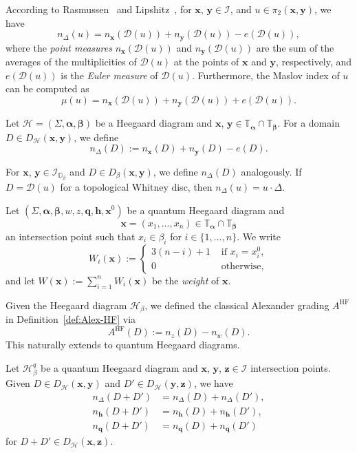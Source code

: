 \documentclass[11pt]{amsart}
\numberwithin{equation}{section}
\numberwithin{figure}{section}
\theoremstyle{definition}
\newcommand{\cD}{\mathcal{D}}
\newcommand{\cH}{\mathcal{H}}
\newcommand{\cI}{\mathcal{I}}
\newcommand{\bD}{\mathbb{D}}
\newcommand{\bT}{\mathbb{T}}
\DeclareMathOperator{\HF}{HF}
\newcommand{\as}{\boldsymbol{\alpha}}
\newcommand{\bs}{\boldsymbol{\beta}}
\newcommand{\hs}{\boldsymbol{h}}
\newcommand{\qs}{\boldsymbol{q}}
\newcommand{\xs}{\boldsymbol{x}}
\newcommand{\ys}{\boldsymbol{y}}
\newcommand{\zs}{\boldsymbol{z}}
\begin{document}
According to Rasmussen~\cite[Theorem~9.1]{Rass} and Lipshitz~\cite[Corollary~4.10]{Lipshitz}, for $\xs$, $\ys \in \cI$, and $u \in \pi_2(\xs,\ys)$, we have
\begin{equation}\label{eqn:diagonal}
n_\Delta(u) = n_{\xs}(\cD(u)) + n_{\ys}(\cD(u)) - e(\cD(u)),
\end{equation}
where the \emph{point measures} $n_{\xs}(\cD(u))$ and  $n_{\ys}(\cD(u))$ are the sum of the averages of the multiplicities of $\cD(u)$ at the points of $\xs$ and $\ys$, respectively, and $e(\cD(u))$ is the \emph{Euler measure} of $\cD(u)$. Furthermore, the Maslov index of $u$ can be computed as
\begin{equation}\label{eqn:Maslov}
\mu(u) = n_{\xs}(\cD(u)) + n_{\ys}(\cD(u)) + e(\cD(u)).
\end{equation}

\begin{defn}\label{def:diagonal-intersection}
Let $\cH = (\Sigma,\as,\bs)$ be a Heegaard diagram and $\xs$, $\ys \in \bT_{\as} \cap \bT_{\bs}$. For a domain $D \in D_{\cH}(\xs,\ys)$, we define 
\[
n_\Delta(D) := n_{\xs}(D) + n_{\ys}(D) - e(D).
\]
\end{defn}

For $\xs$, $\ys \in \cI_{\bD_\beta}$ and $D \in D_\beta(\xs,\ys)$, we define $n_\Delta(D)$ analogously. If $D = \cD(u)$ for a topological Whitney disc, then $n_\Delta(u) = u \cdot \Delta$.

\begin{defn}\label{def:W}
Let $(\Sigma,\as,\bs, w, z, \qs, \hs, \xs^0)$ be a quantum Heegaard diagram and 
\[
\xs = (x_1,\dots,x_n) \in \bT_{\as} \cap \bT_{\bs}
\]
an intersection point such that $x_i \in \beta_i$ for $i \in \{1,\dots,n\}$. We write
\[
W_i(\xs) := 
\begin{cases}
    3(n-i)+1 &\text{ if } x_i = x_i^0, \\
    0 & \text{ otherwise,}
\end{cases}
\]
and let $W(\xs) := \sum_{i=1}^n W_i(\xs)$ be the \emph{weight} of $\xs$.
\end{defn}

Given the Heegaard diagram $\mathscr H_{\beta}$, we defined the classical Alexander grading $A^{\HF}$ in Definition~\ref{def:Alex-HF} via
\[
A^{\HF}(D):=n_{z}(D)-n_{w}(D).
\]
This naturally extends to quantum Heegaard diagrams. 

\begin{lem}\label{lem:additivity}
    Let $\cH^q_\beta$ be a quantum Heegaard diagram and $\xs$, $\ys$, $\zs \in \cI$ intersection points. Given $D \in D_\cH(\xs,\ys)$ and $D' \in D_\cH(\ys, \zs)$, we have
    \[
    \begin{split}
    n_\Delta(D+D') &= n_\Delta(D) + n_\Delta(D'),\\
    n_{\hs}(D+D') &= n_{\hs}(D) + n_{\hs}(D'),\\
    n_{\qs}(D+D') &= n_{\qs}(D) + n_{\qs}(D')
    \end{split}
    \]
    for $D+D' \in D_\cH(\xs,\zs)$.
\end{lem}
\end{document}
